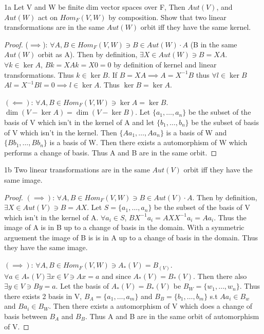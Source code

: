 \documentclass{article}
\begin{document}
\begin{claim}{1a}
    Let V and W be finite dim vector spaces over F, Then $Aut(V)$, and $Aut(W)$ act on $Hom_F(V,W)$ by composition.  Show that two linear transformations are in the same $Aut(W)$ orbit iff they have the same kernel.
\end{claim}
\begin{proof}
    ($\implies$): $\forall A, B \in Hom_F(V,W) \ni B \in Aut(W) \cdot A$ (B in the same $Aut(W)$ orbit as A). Then by definition, $\exists X \in Aut(W) \ni B = XA$. $\forall k \in \ker A$, $Bk = XAk = X0 = 0$ by definition of kernel and linear transformations. Thus $k \in \ker B$. If $B = XA \implies A = X^{-1}B$ thus $\forall l \in \ker B$ $Al = X^{-1}Bl = 0 \implies l \in \ker A$. Thus $\ker B = \ker A$. 

    $(\impliedby)$: $\forall A, B \in Hom_F(V, W) \ni \ker A = \ker B$. $\dim(V - \ker A) = \dim(V - \ker B)$. Let $\{a_1, \ldots, a_n\}$ be the subset of the basis of V which isn't in the kernel of A and let $\{b_1, \ldots, b_n\}$ be the subset of basis of V which isn't in the kernel. Then $\{Aa_1, \ldots, Aa_n\}$ is a basis of W and $\{Bb_1, \ldots, Bb_n\}$ is a basis of W. Then there exists a automorphism of W which performs a change of basis. Thus A and B are in the same orbit.
\end{proof}
\begin{claim}{1b}
    Two linear transformations are in the same $Aut(V)$ orbit iff they have the same image. 
\end{claim}
\begin{proof}
    $(\implies)$: $\forall A, B \in Hom_F(V,W) \ni B \in Aut(V) \cdot A$. Then by definition, $\exists X \in Aut(V) \ni B = AX$. Let $S = \{a_1, \ldots, a_n\}$ be the subset of the basis of V which isn't in the kernel of A. $\forall a_i \in S$, $BX^{-1}a_i = AXX^{-1}a_i = Aa_i$. Thus the image of A is in B up to a change of basis in the domain. With a symmetric arguement the image of B is is in A up to a change of basis in the domain. Thus they have the same image. 

    $(\implies)$: $\forall A, B \in Hom_F(V, W) \ni A_*(V) = B_(V)$. $\forall a \in A_*(V) \exists x \in V \ni Ax = a$ and since $A_*(V) = B_*(V)$. Then there also $\exists y \in V \ni By = a$. Let the basis of $A_*(V) = B_*(V)$ be $B_W = \{w_1, \ldots, w_n\}$. Thus there exists 2 basis in V, $B_A = \{a_1, \ldots, a_m\}$ and $B_B = \{b_1, \ldots, b_m\}$ s.t $Aa_i \in B_w$ and $Ba_i \in B_W$. Then there exists a automorphism of V which does a change of basis between $B_A$ and $B_B$. Thus A and B are in the same orbit of automorphism of V.
\end{proof}
\end{document}
